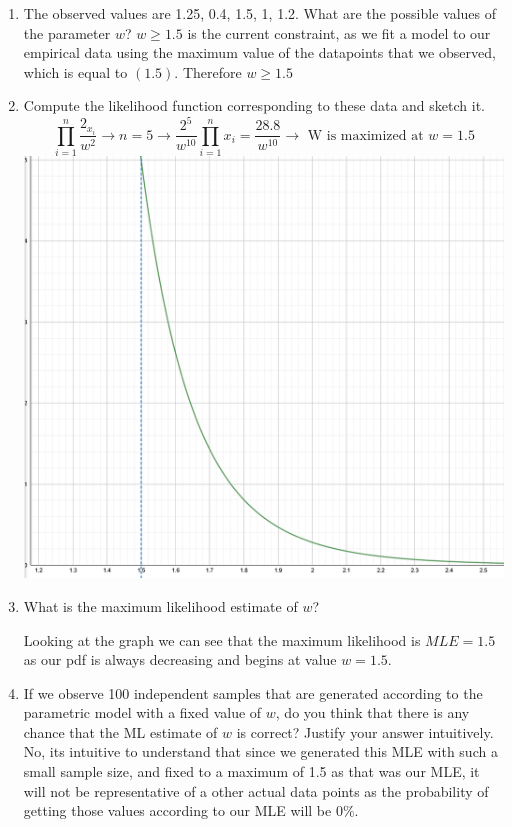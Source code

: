 \documentclass[12pt,twoside]{article}
\begin{document}
\begin{enumerate}
\begin{enumerate}
\item The observed values are 1.25, 0.4, 1.5, 1, 1.2. What are the possible values of the parameter $w$? 
\subitem $w \geq 1.5$ is the current constraint, as we fit a model to our empirical data using the maximum value of the datapoints that we observed, which is equal to $(1.5)$. Therefore $w \geq 1.5$ 
\item Compute the likelihood function corresponding to these data and sketch it. 
\subitem 
$$
\prod_{i=1}^n \frac{2_{x_i}}{w^2} \rightarrow n=5 \rightarrow \frac{2^5}{w^{10}} \prod_{i=1}^n x_i = \frac{28.8}{w^{10}} \rightarrow \text{ W is maximized at } w=1.5
$$
\includegraphics[scale=.34]{Hw3 graph.png}
\item What is the maximum likelihood estimate of $w$? 

Looking at the graph we can see that the maximum likelihood is $MLE = 1.5$ as our pdf is always decreasing and begins at value $w=1.5$. 

\item  If we observe 100 independent samples that are generated according to the parametric model with a fixed value of $w$, do you think that there is any chance that the ML estimate of $w$ is correct? Justify your answer intuitively.
\subitem No, its intuitive to understand that since we generated this MLE with such a small sample size, and fixed to a maximum of 1.5 as that was our MLE, it will not be representative of a other actual data points as the probability of getting those values according to our MLE will be 0$\%$.


\end{enumerate}
\end{enumerate}
\end{document}
